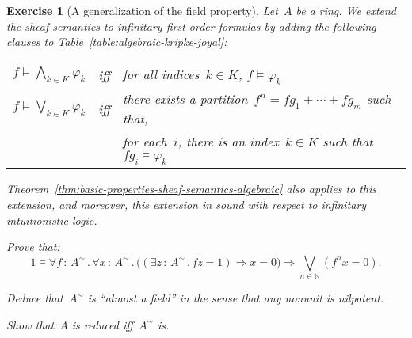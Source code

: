 \documentclass{ws-rv9x6}
\newtheorem{ex}{Exercise}
\newenvironment{exercise}[1]{
  \begin{ex}[#1]
}{\end{ex}}
\newcommand{\NN}{\mathbb{N}}
\renewcommand{\_}{\mathpunct{.}}
\newcommand{\?}{\,{:}\,}
\begin{document}
\begin{exercise}{A generalization of the field property}%
\label{ex:gen-field-property}%
Let~$A$ be a ring. We extend the sheaf semantics to infinitary first-order
formulas by adding the following clauses to
Table~\ref{table:algebraic-kripke-joyal}:
\begin{center}\tablefont
\begin{tabular}{@{}l@{\ \ }c@{\ \ }l@{}}
  $f \models \bigwedge_{k \in K} \varphi_k$ &iff&
    for all indices~$k \in K$, $f \models \varphi_k$ \\
  $f \models \bigvee_{k \in K} \varphi_k$ &iff&
    there exists a partition~$f^n = fg_1 + \cdots + fg_m$ such that, \\
  &&\quad for each~$i$, there is an index~$k \in K$ such that~$fg_i \models \varphi_k$
\end{tabular}
\end{center}
Theorem~\ref{thm:basic-properties-sheaf-semantics-algebraic}
also applies to this extension, and moreover, this extension in sound with
respect to infinitary intuitionistic logic.
\begin{alphlist}[(c)]
\item Prove that:
\[ 1 \models \forall f\?A^\sim\_ \forall x\?A^\sim\_
  \bigl((\exists z\?A^\sim\_ fz = 1) \Rightarrow x = 0\bigr) \Longrightarrow \bigvee_{n \in \NN} (f^n x = 0). \]
\item Deduce that~$A^\sim$ is ``almost a field'' in the sense that any nonunit
is nilpotent.
\item Show that~$A$ is reduced iff~$A^\sim$ is.
\end{alphlist}
\end{exercise}
\end{document}
